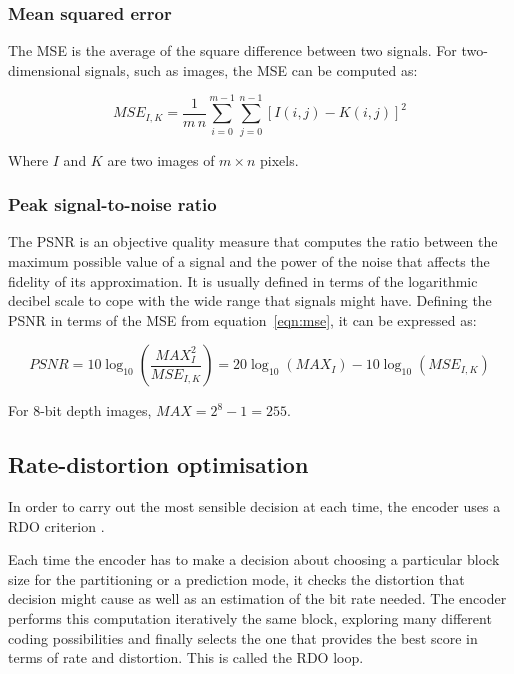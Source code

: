 \documentclass[11pt,a4paper,openright,twoside]{book}
\numberwithin{equation}{section} %
\begin{document}
\subsubsection{Mean squared error}
\label{ssub:mean_squared_error}

The \ac{MSE} is the average of the square difference between two
signals.
For two-dimensional signals, such as images, the \ac{MSE} can be computed as:

\begin{equation}
	MSE_{I,K} = \frac{1}{m\,n} \sum\limits_{i=0}^{m-1} \sum\limits_{j=0}^{n-1}
	{\left[ I(i,j) - K(i,j) \right]} ^2
	\label{eqn:mse}
\end{equation}

Where $I$ and $K$ are two images of $m \times n$ pixels.

\subsubsection{Peak signal-to-noise ratio}
\label{ssub:peak_signal_to_noise_ratio}

The \ac{PSNR} is an objective quality measure that computes the ratio
between the maximum possible value of a signal and the power of the
noise that affects the fidelity of its approximation.
It is usually defined in terms of the logarithmic decibel scale to cope
with the wide range that signals might have.
Defining the \ac{PSNR} in terms of the \ac{MSE} from
equation~\ref{eqn:mse}, it can be expressed as:

\begin{equation}
	PSNR = 10 \log_{10} \left(\frac{MAX_I^2}{MSE_{I,K}}\right)
	= 20 \log_{10} (MAX_I) - 10 \log_{10} (MSE_{I,K})
	\label{eqn:psnr}
\end{equation}

For 8-bit depth images, $MAX = 2^{8} - 1 = 255$.

\subsection{Rate-distortion optimisation}
\label{sub:rate_distortion_optimisation}

In order to carry out the most sensible decision at each time, the
encoder uses a \ac{RDO} criterion
\cite{sullivan-98-rdo-video-compression}.

Each time the encoder has to make a decision about choosing a
particular block size for the partitioning or a prediction mode, it
checks the distortion that decision might cause as well as an estimation
of the bit rate needed.
The encoder performs this computation iteratively the same block,
exploring many different coding possibilities and finally selects the
one that provides the best score in terms of rate and distortion.
This is called the \ac{RDO} loop.
\end{document}
